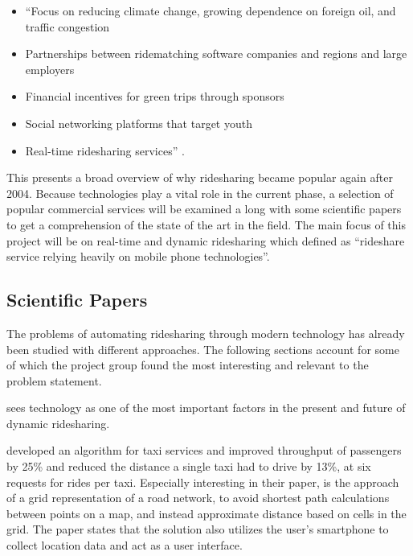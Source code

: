 \begin{itemize}
  \item ``Focus on reducing climate change, growing dependence on foreign oil, and traffic congestion
  \item Partnerships between ridematching software companies and regions and large employers
  \item Financial incentives for green trips through sponsors
  \item Social networking platforms that target youth
  \item Real-time ridesharing services'' \citep{doi:10.1080/01441647.2011.621557}.
\end{itemize}

This presents a broad overview of why ridesharing became popular again after 2004.
Because technologies play a vital role in the current phase, a selection of popular commercial services will be examined a long with some scientific papers to get a comprehension of the state of the art in the field.
The main focus of this project will be on real-time and dynamic ridesharing which \citet{amey2011real} defined as ``rideshare service relying heavily on mobile phone technologies''.

\subsection{Scientific Papers}
The problems of automating ridesharing through modern technology has already been studied with different approaches.
The following sections account for some of which the project group found the most interesting and relevant to the problem statement. 

\citet{doi:10.1080/01441647.2011.621557, amey2011real} sees technology as one of the most important factors in the present and future of dynamic ridesharing.

\citet{ShuoMa2013} developed an algorithm for taxi services and improved throughput of passengers by 25\% and reduced the distance a single taxi had to drive by 13\%, at six requests for rides per taxi. %
Especially interesting in their paper, is the approach of a grid representation of a road network, to avoid shortest path calculations between points on a map, and instead approximate distance based on cells in the grid.
The paper states that the solution also utilizes the user's smartphone to collect location data and act as a user interface.

